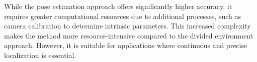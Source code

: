 While the pose estimation approach offers significantly higher accuracy, it requires greater computational resources due to additional processes, such as camera calibration to determine intrinsic parameters. This increased complexity makes the method more resource-intensive compared to the divided environment approach. However, it is suitable for applications where continuous and precise localization is essential.



